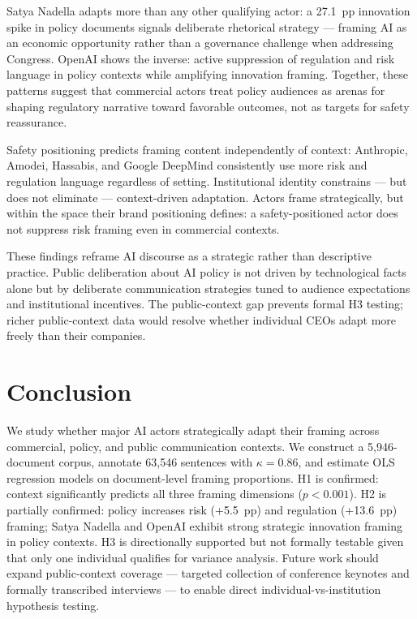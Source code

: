 \documentclass[11pt,a4paper,twocolumn]{article}
\begin{document}
Satya Nadella adapts more than any other qualifying actor: a 27.1~pp innovation
spike in policy documents signals deliberate rhetorical strategy — framing AI
as an economic opportunity rather than a governance challenge when addressing
Congress. OpenAI shows the inverse: active suppression of regulation and risk
language in policy contexts while amplifying innovation framing. Together, these
patterns suggest that commercial actors treat policy audiences as arenas for
shaping regulatory narrative toward favorable outcomes, not as targets for
safety reassurance.

Safety positioning predicts framing content independently of context: Anthropic,
Amodei, Hassabis, and Google DeepMind consistently use more risk and regulation
language regardless of setting. Institutional identity constrains — but does
not eliminate — context-driven adaptation. Actors frame strategically, but
within the space their brand positioning defines: a safety-positioned actor
does not suppress risk framing even in commercial contexts.

These findings reframe AI discourse as a strategic rather than descriptive
practice. Public deliberation about AI policy is not driven by technological
facts alone but by deliberate communication strategies tuned to audience
expectations and institutional incentives. The public-context gap prevents
formal H3 testing; richer public-context data would resolve whether individual
CEOs adapt more freely than their companies.


\section{Conclusion}

We study whether major AI actors strategically adapt their framing across
commercial, policy, and public communication contexts. We construct a 5,946-document
corpus, annotate 63,546 sentences with $\kappa = 0.86$, and estimate OLS
regression models on document-level framing proportions. H1 is confirmed:
context significantly predicts all three framing dimensions ($p < 0.001$). H2
is partially confirmed: policy increases risk (+5.5~pp) and regulation
(+13.6~pp) framing; Satya Nadella and OpenAI exhibit strong strategic innovation
framing in policy contexts. H3 is directionally supported but not formally
testable given that only one individual qualifies for variance analysis. Future
work should expand public-context coverage — targeted collection of conference
keynotes and formally transcribed interviews — to enable direct
individual-vs-institution hypothesis testing.
\end{document}
